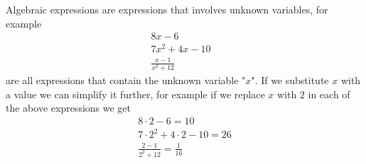 %
% 
%
%

Algebraic expressions are expressions that involves unknown variables,
for example
\begin{align*}
8x - 6               &   \\
7x^2 + 4x - 10       &  \\
\frac{x-1}{x^2 + 12} &
\end{align*}
are all expressions that contain the unknown variable "$x$". If we
substitute $x$ with a value we can simplify it further, for example if we
replace $x$ with $2$ in each of the above expressions we get
\begin{align*}
8 \cdot 2 - 6 = 10                \\
7 \cdot 2^2 + 4 \cdot 2 - 10 = 26 \\
\frac{2-1}{2^2 + 12} = \frac{1}{16}
\end{align*}

